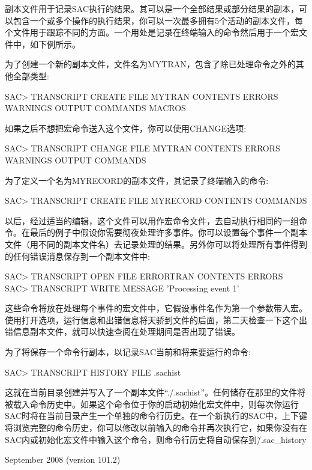 副本文件用于记录SAC执行的结果。其可以是一个全部结果或部分结果的副本，可以包含一个或多个操作的执行结果，你可以一次最多拥有5个活动的副本文件，每个文件用于跟踪不同的方面。一个用处是记录在终端输入的命令然后用于一个宏文件中，如下例所示。

为了创建一个新的副本文件，文件名为MYTRAN，包含了除已处理命令之外的其他全部类型:
\begin{SACCode}
SAC> TRANSCRIPT CREATE FILE MYTRAN CONTENTS ERRORS WARNINGS OUTPUT COMMANDS MACROS
\end{SACCode}

如果之后不想把宏命令送入这个文件，你可以使用CHANGE选项:
\begin{SACCode}
SAC> TRANSCRIPT CHANGE FILE MYTRAN CONTENTS ERRORS WARNINGS OUTPUT COMMANDS
\end{SACCode}

为了定义一个名为MYRECORD的副本文件，其记录了终端输入的命令:
\begin{SACCode}
SAC> TRANSCRIPT CREATE FILE MYRECORD CONTENTS COMMANDS
\end{SACCode}

以后，经过适当的编辑，这个文件可以用作宏命令文件，去自动执行相同的一组命令。在最后的例子中假设你需要彻夜处理许多事件。你可以设置每个事件一个副本文件（用不同的副本文件名）去记录处理的结果。另外你可以将处理所有事件得到的任何错误消息保存到一个副本文件中:
\begin{SACCode}
SAC> TRANSCRIPT OPEN FILE ERRORTRAN CONTENTS ERRORS
SAC> TRANSCRIPT WRITE MESSAGE 'Processing event 1'
\end{SACCode}

这些命令将放在处理每个事件的宏文件中，它假设事件名作为第一个参数带入宏。使用打开选项，运行信息和出错信息将天骄到文件的后面，第二天检查一下这个出错信息副本文件，就可以快速查阅在处理期间是否出现了错误。

为了将保存一个命令行副本，以记录SAC当前和将来要运行的命令:
\begin{SACCode}
SAC> TRANSCRIPT HISTORY FILE .sachist
\end{SACCode}
这就在当前目录创建并写入了一个副本文件``./.sachist''。任何储存在那里的文件将被载入命令历史中。如果这个命令位于你的启动初始化宏文件中，则每次你运行SAC时将在当前目录产生一个单独的命令行历史。在一个新执行的SAC中，上下键将浏览完整的命令历史，你可以修改以前输入的命令并再次执行它，如果你没有在SAC内或初始化宏文件中输入这个命令，则命令行历史将自动保存到\~/.sac\_history

September 2008 (version 101.2)
